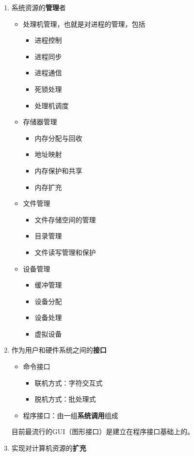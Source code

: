 \documentclass[12pt, a4paper, oneside]{ctexart}
\begin{document}
\begin{enumerate}
  \item 系统资源的\textbf{管理}者
  \begin{itemize}
    \item 处理机管理，也就是对进程的管理，包括
    \begin{itemize}
      \item 进程控制
      \item 进程同步
      \item 进程通信
      \item 死锁处理
      \item 处理机调度
    \end{itemize}
    \item 存储器管理
    \begin{itemize}
      \item 内存分配与回收
      \item 地址映射
      \item 内存保护和共享
      \item 内存扩充
    \end{itemize}
    \item 文件管理
    \begin{itemize}
      \item 文件存储空间的管理
      \item 目录管理
      \item 文件读写管理和保护
    \end{itemize}
    \item 设备管理
    \begin{itemize}
      \item 缓冲管理
      \item 设备分配
      \item 设备处理
      \item 虚拟设备
    \end{itemize}
  \end{itemize}
  \item 作为用户和硬件系统之间的\textbf{接口}
  \begin{itemize}
    \item 命令接口
    \begin{itemize}
      \item 联机方式：字符交互式
      \item 脱机方式：批处理式
    \end{itemize}
    \item 程序接口：由一组\textbf{系统调用}组成
  \end{itemize}

  目前最流行的GUI（图形接口）是建立在程序接口基础上的。

  \item 实现对计算机资源的\textbf{扩充}
\end{enumerate}
\end{document}
